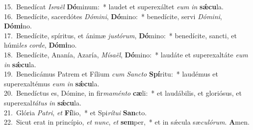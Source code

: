 {15.~}Benedícat \textit{Is}\textit{ra}\textit{ël} \textbf{Dó}minum:~* laudet et superexáltet \textit{e}\textit{um} \textit{in} \textbf{sǽ}\textbf{cu}la.\\
{16.~}Benedícite, sacerdótes \textit{Dó}\textit{mi}\textit{ni}, \textbf{Dó}mino:~* benedícite, servi \textit{Dó}\textit{mi}\textit{ni}, \textbf{Dó}\textbf{mi}no.\\
{17.~}Benedícite, spíritus, et ánimæ \textit{ju}\textit{stó}\textit{rum}, \textbf{Dó}mino:~* benedícite, sancti, et húmi\textit{les} \textit{cor}\textit{de}, \textbf{Dó}\textbf{mi}no.\\
{18.~}Benedícite, Ananía, Azaría, \textit{Mí}\textit{sa}\textit{ël}, \textbf{Dó}mino:~* laudáte et superexaltáte \textit{e}\textit{um} \textit{in} \textbf{sǽ}\textbf{cu}la.\\
{19.~}Benedicámus Patrem et Fílium \textit{cum} \textit{San}\textit{cto} \textbf{Spí}ritu:~* laudémus et superexaltémus \textit{e}\textit{um} \textit{in} \textbf{sǽ}\textbf{cu}la.\\
{20.~}Benedíctus es, Dómine, in fir\textit{ma}\textit{mén}\textit{to} \textbf{cæ}li:~* et laudábilis, et gloriósus, et superexal\textit{tá}\textit{tus} \textit{in} \textbf{sǽ}\textbf{cu}la.\\
{21.~}Glória \textit{Pa}\textit{tri}, \textit{et} \textbf{Fí}lio,~* et Spi\textit{rí}\textit{tu}\textit{i} \textbf{San}cto.\\
{22.~}Sicut erat in princípio, \textit{et} \textit{nunc}, \textit{et} \textbf{sem}per,~* et in sǽcula sæ\textit{cu}\textit{ló}\textit{rum}. \textbf{A}men.\\
